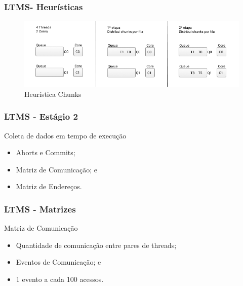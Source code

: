 \documentclass[10pt, pdf,xcolor=pdftex,dvipsnames,table]{beamer}
\begin{document}
\begin{frame} \frametitle{LTMS- Heurísticas}
    \begin{figure}[!h]
        \includegraphics[scale=0.4]{images/Queue_chunks}
        \caption{Heurística Chunks}
        \label{fig:abusy}
    \end{figure}
\end{frame}

\begin{frame} \frametitle{LTMS - Estágio 2}
    \begin{block}{Coleta de dados em tempo de execução}
        \begin{itemize}
        	\item Aborts e Commits;
        	\item Matriz de Comunicação; e 
        	\item Matriz de Endereços.
        \end{itemize}
    \end{block}
\end{frame}

\begin{frame} \frametitle{LTMS - Matrizes}
    \begin{block}{Matriz de Comunicação}
        \begin{itemize}
        	\item Quantidade de comunicação entre pares de threads;
        	\item Eventos de Comunicação; e
        	\item 1 evento a cada 100 acessos.
        \end{itemize}
    \end{block}
\end{frame}
\end{document}
